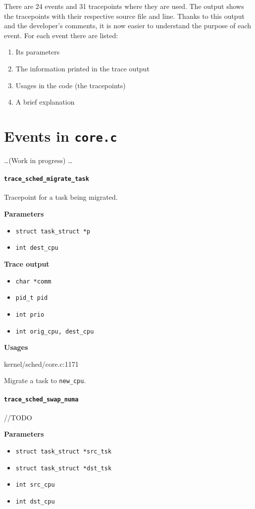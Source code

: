 There are 24 events and 31 tracepoints where they are used. The output shows the tracepoints with their respective source file and line. Thanks to this output and the developer's comments, it is now easier to understand the purpose of each event. For each event there are listed: 
\begin{enumerate}
    \item Its parameters
    \item The information printed in the trace output
    \item Usages in the code (the tracepoints)
    \item A brief explanation
\end{enumerate}

\section{Events in \texttt{core.c}} 
\dots (Work in progress) \dots
\paragraph{\texttt{trace\_sched\_migrate\_task}}
Tracepoint for a task being migrated.

\textbf{Parameters}
\begin{itemize}
    \item \verb|struct task_struct *p|
    \item \verb|int dest_cpu|
\end{itemize}

\textbf{Trace output}
\begin{itemize}
    \item \verb|char *comm|
    \item \verb|pid_t pid|
    \item \verb|int prio|
    \item \verb|int orig_cpu, dest_cpu|
\end{itemize}

\textbf{Usages}
\begin{code}
kernel/sched/core.c:1171
\end{code}
Migrate a task to \verb|new_cpu|.
  
\paragraph{\texttt{trace\_sched\_swap\_numa}}
//TODO

\textbf{Parameters}
\begin{itemize}
    \item \verb|struct task_struct *src_tsk|
    \item \verb|struct task_struct *dst_tsk|
    \item \verb|int src_cpu|
    \item \verb|int dst_cpu|    
\end{itemize}

